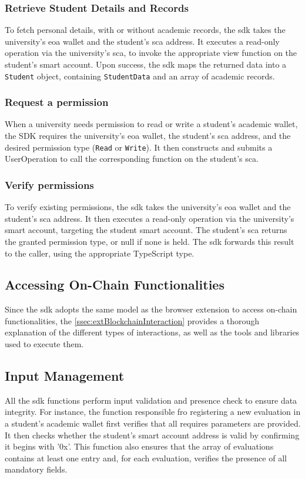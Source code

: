 \subsubsection{Retrieve Student Details and Records}
To fetch personal details, with or without academic records, the \acrshort{sdk} takes the university's \acrshort{eoa} wallet and the student's \acrshort{sca} address. It executes a read-only operation via the university's \acrshort{sca}, to invoke the appropriate view function on the student's smart account. Upon success, the \acrshort{sdk} maps the returned data into a \texttt{Student} object, containing \texttt{StudentData} and an array of academic records.

\subsubsection{Request a permission}
When a university needs permission to read or write a student’s academic wallet, the SDK requires the university’s \acrshort{eoa} wallet, the student’s \acrshort{sca} address, and the desired permission type (\texttt{Read} or \texttt{Write}). It then constructs and submits a UserOperation to call the corresponding function on the student’s \acrshort{sca}.

\subsubsection{Verify permissions}
To verify existing permissions, the \acrshort{sdk} takes the university's \acrshort{eoa} wallet and the student's \acrshort{sca} address. It then executes a read-only operation via the university's smart account, targeting the student smart account. The student's \acrshort{sca} returns the granted permission type, or null if none is held. The \acrshort{sdk} forwards this result to the caller, using the appropriate TypeScript type.

\subsection{Accessing On-Chain Functionalities}
Since the \acrshort{sdk} adopts the same model as the browser extension to access on-chain functionalities, the \cref{ssec:extBlockchainInteraction} provides a thorough explanation of the different types of interactions, as well as the tools and libraries used to execute them.

\subsection{Input Management}
All the \acrshort{sdk} functions perform input validation and presence check to ensure data integrity. For instance, the function responsible fro registering a new evaluation in a student's academic wallet first verifies that all requires parameters are provided. It then checks whether the student's smart account address is valid by confirming it begins with '0x'. This function also ensures that the array of evaluations contains at least one entry and, for each evaluation, verifies the presence of all mandatory fields.

